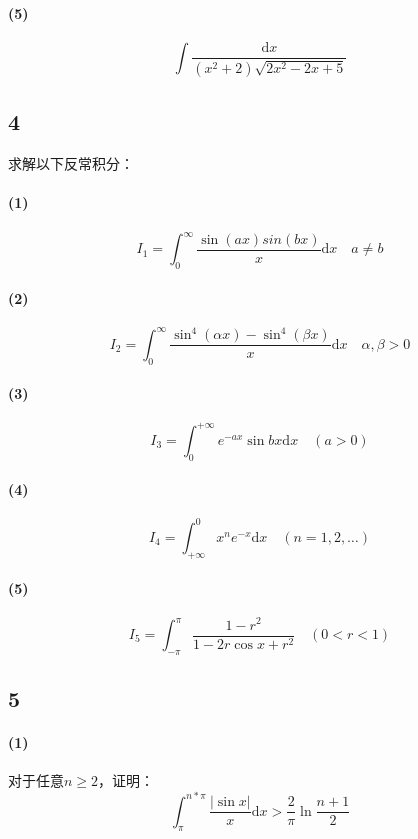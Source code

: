 \documentclass[a4paper,12pt]{article}
\begin{document}
\paragraph{(5)}
\begin{equation*}
	\int \frac{\mathrm{d}x}{(x^2+2)\sqrt{2x^2-2x+5}}
\end{equation*}
\subsection*{4}求解以下反常积分：
\paragraph{(1)}
\begin{equation*}
	I_{1}=\int_{0}^{\infty}\frac{\sin(ax)sin(bx)}{x}\mathrm{d}x\quad a\neq b
\end{equation*}
\paragraph{(2)}
\begin{equation*}
	I_{2}=\int_{0}^{\infty}\frac{\sin^4 (\alpha x)-\sin^4{(\beta x)}}{x}\mathrm{d}x\quad \alpha,\beta >0
\end{equation*}
\paragraph{(3)}
\begin{equation*}
	I_{3}=\int_{0}^{+\infty}e^{-ax}\sin bx\mathrm{d}x\quad(a>0)
\end{equation*}
\paragraph{(4)}
\begin{equation*}
	I_{4}=\int_{+\infty}^{0}x^{n}e^{-x}\mathrm{d}x\quad(n=1,2,\dots)
\end{equation*}
\paragraph{(5)}
\begin{equation*}
	I_{5}=\int_{-\pi}^{\pi}\frac{1-r^{2}}{1-2r\cos x +r^2}\quad(0<r<1)
\end{equation*}
\subsection*{5}
\paragraph{(1)}
对于任意$n\geq 2$，证明：
\begin{equation*}
	\int_{\pi}^{n*\pi}\frac{\left|\sin x\right|}{x}\mathrm{d}x>\frac{2}{\pi}\ln\frac{n+1}{2}
\end{equation*}
\end{document}
